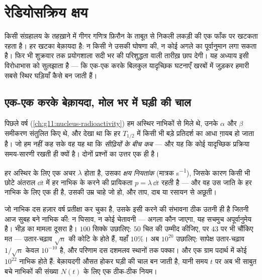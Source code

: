 \chapter{रेडियोसक्रिय क्षय}\label{ch:g12:radioactive-decay}

किसी संग्रहालय के तहख़ाने में गीगर गणित्र फ़िरौन के ताबूत से निकली लकड़ी की एक
फाँक पर खटकता रहता है। हर खटका बेक़ायदा है: न किसी ने उसकी घोषणा की, न कोई अगले
का पूर्वानुमान लगा सकता है। फिर भी शुक्रवार तक प्रयोगशाला सदी भर की परिशुद्धता
वाली तारीख़ छाप देगी। यह अध्याय इसी विरोधाभास को सुलझाता है --- कि एक-एक करके
बिलकुल यादृच्छिक घटनाएँ खरबों में जुड़कर हमारी सबसे स्थिर घड़ियाँ कैसे बन जाती
हैं।

\section{एक-एक करके बेक़ायदा, मोल भर में घड़ी की चाल}

पिछले वर्ष (\cref{ch:g11:nucleus-radioactivity}) हम अस्थिर नाभिकों से मिले थे, उनके $\alpha$ और $\beta$
समीकरण संतुलित किए थे, और देखा था कि हर  $T_{1/2}$ में किसी भी बड़े
प्रतिदर्श का आधा ग़ायब हो जाता है। जो हम नहीं कह सके वह यह था कि \emph{सीढ़ियों
के बीच कब} --- और यह कि कोई यादृच्छिक प्रक्रिया समय-सारणी रखती ही क्यों है।
दोनों प्रश्नों का उत्तर एक ही है।

\begin{definition}[क्षय नियतांक]\label{def:g12:radioactive-decay:lambda}
हर अस्थिर  के लिए एक अचर $\lambda$ होता है, उसका
\emph{क्षय नियतांक} (मात्रक \unit{s^{-1}}), जिसके कारण
किसी भी छोटे अंतराल $\dd t$ में हर नाभिक के  करने की प्रायिकता
$p = \lambda\,\dd t$ रहती है --- और वह उस जाति के हर नाभिक के लिए एक ही है, उसकी उम्र
चाहे जो हो, और ताप, दाब या रसायन से अछूती।
\end{definition}

\begin{remark}[अकेले में बेक़ायदा, भीड़ में ठीक-ठीक]\label{rem:g12:radioactive-decay:crowds}
जो नाभिक दस हज़ार वर्ष प्रतीक्षा कर चुका है, उसके इसी   करने
की संभावना ठीक उतनी ही है जितनी आज सुबह बने नाभिक की: न घिसाव, न कोई चेतावनी
--- अगला कौन जाएगा, यह सचमुच अपूर्वानुमेय है। भीड़ का मामला दूसरा है। $100$
सिक्के उछालिए: $50$ चित की उम्मीद कीजिए, पर $43$ पर भी चौंकिए मत ---
उतार-चढ़ाव $\sqrt n$ की कोटि के होते हैं, यहाँ $10\%$। अब $10^{20}$ उछालिए: सापेक्ष
उतार-चढ़ाव $1/\sqrt n$ केवल $10^{-10}$ है, और परिणाम दस दशमलव स्थानों तक पक्का। और एक
ग्राम पदार्थ में कोई $10^{22}$ नाभिक होते हैं: बेक़ायदगी औसत होकर घड़ी की चाल बन
जाती है, यानी समय $t$ पर अब भी साबुत बचे नाभिकों की संख्या $N(t)$ के लिए
एक ठीक-ठीक नियम।
\end{remark}

